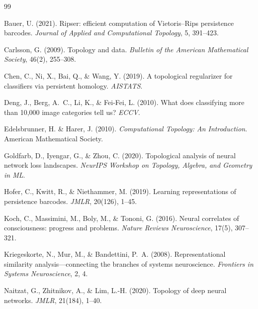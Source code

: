 \documentclass[11pt,a4paper]{article}
\begin{document}
\begin{thebibliography}{99}

Bauer, U. (2021).
\newblock Ripser: efficient computation of {V}ietoris--{R}ips persistence barcodes.
\newblock \emph{Journal of Applied and Computational Topology}, 5, 391--423.

Carlsson, G. (2009).
\newblock Topology and data.
\newblock \emph{Bulletin of the American Mathematical Society}, 46(2), 255--308.

Chen, C., Ni, X., Bai, Q., \& Wang, Y. (2019).
\newblock A topological regularizer for classifiers via persistent homology.
\newblock \emph{AISTATS}.

Deng, J., Berg, A.~C., Li, K., \& Fei-Fei, L. (2010).
\newblock What does classifying more than 10,000 image categories tell us?
\newblock \emph{ECCV}.

Edelsbrunner, H. \& Harer, J. (2010).
\newblock \emph{Computational Topology: An Introduction}.
\newblock American Mathematical Society.

Goldfarb, D., Iyengar, G., \& Zhou, C. (2020).
\newblock Topological analysis of neural network loss landscapes.
\newblock \emph{NeurIPS Workshop on Topology, Algebra, and Geometry in ML}.

Hofer, C., Kwitt, R., \& Niethammer, M. (2019).
\newblock Learning representations of persistence barcodes.
\newblock \emph{JMLR}, 20(126), 1--45.

Koch, C., Massimini, M., Boly, M., \& Tononi, G. (2016).
\newblock Neural correlates of consciousness: progress and problems.
\newblock \emph{Nature Reviews Neuroscience}, 17(5), 307--321.

Kriegeskorte, N., Mur, M., \& Bandettini, P.~A. (2008).
\newblock Representational similarity analysis---connecting the branches of systems neuroscience.
\newblock \emph{Frontiers in Systems Neuroscience}, 2, 4.

Naitzat, G., Zhitnikov, A., \& Lim, L.-H. (2020).
\newblock Topology of deep neural networks.
\newblock \emph{JMLR}, 21(184), 1--40.


\end{thebibliography}
\end{document}
